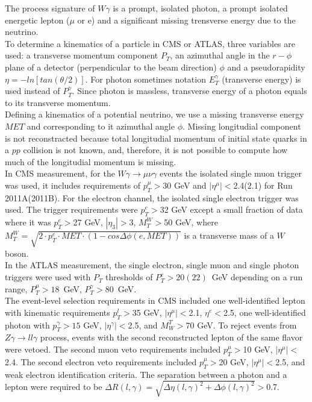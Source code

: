 The process signature of $W\gamma$ is a prompt, isolated photon, a prompt isolated energetic lepton ($\mu$ or e) and a significant missing trensverse energy due to the neutrino. \\ 

To determine a kinematics of a particle in CMS or ATLAS, three variables are used: a transverse momentum component $P_T$, an azimuthal angle in the $r-\phi$ plane of a detector (perpendicular to the beam direction) $\phi$ and a pseudorapidity $\eta=-ln[tan(\theta/2)]$. For photon sometimes notation $E_T^\gamma$ (transverse energy) is used instead of $P_T^\gamma$. Since photon is massless, transverse energy of a photon equals to its transverse momentum.\\

Defining a kinematics of a potential neutrino, we use a missing transverse energy $MET$ and corresponding to it azimuthal angle $\phi$. Missing longitudial component is not reconstracted because total longitudial momentum of initial state quarks in a $pp$ collision is not known, and, therefore, it is not possible to compute how much of the longitudial momentum is missing.\\  

In CMS measurement, for the $W\gamma\rightarrow\mu\nu\gamma$ events the isolated single muon trigger was used, it includes requirements of $p_T^{\mu}>$30 GeV and $|\eta^{\mu}|<$2.4(2.1) for Run 2011A(2011B). For the electron channel, the isolated single electron trigger was used. The trigger requirements were $p_T^e>$32 GeV except a small fraction of data where it was $p_T^e>$27 GeV, $|\eta_3|>$3, $M_T^W>$50 GeV, where $M_T^W=\sqrt{2 \cdot p_T^e \cdot MET \cdot (1-cos\Delta\phi(e,MET))}$ is a transverse mass of a $W$ boson.\\

In the ATLAS measurement, the single electron, single muon and single photon triggers were used with $P_T$ thresholds of $P_T^e>20(22)$~GeV depending on a run range, $P_T^\mu>18$~GeV, $P_T^\gamma>80$~GeV.\\


The event-level selection requirements in CMS included one well-identified lepton with kinematic requirements $p_T^l>$35 GeV, $|\eta^\mu|<$2.1, $\eta^e<$2.5, one well-identified photon with $p_T^\gamma>15$ GeV, $|\eta^\gamma|<$2.5, and $M_W^T>$70 GeV. To reject events from $Z\gamma\rightarrow ll\gamma$ process, events with the second reconstructed lepton of the same flavor were vetoed. The second muon veto requirements included $p_T^\mu>$10 GeV, $|\eta^\mu|<$2.4. The second electron veto requirements included $p_T^\mu>$20 GeV, $|\eta^\mu|<$2.5, and weak electron identification criteria. The separation between a photon and a lepton were required to be $\Delta R(l,\gamma) = \sqrt{\Delta \eta(l,\gamma)^2 + \Delta \phi(l,\gamma)^2}>$0.7.\\  

